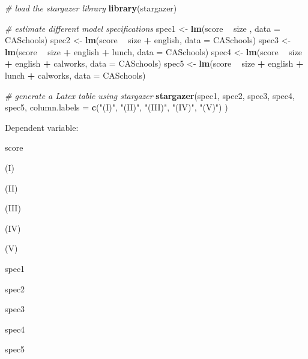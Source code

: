 \documentclass[]{book}
\newenvironment{Shaded}{\begin{snugshade}}{\end{snugshade}}
\newcommand{\KeywordTok}[1]{\textcolor[rgb]{0.13,0.29,0.53}{\textbf{#1}}}
\newcommand{\DataTypeTok}[1]{\textcolor[rgb]{0.13,0.29,0.53}{#1}}
\newcommand{\StringTok}[1]{\textcolor[rgb]{0.31,0.60,0.02}{#1}}
\newcommand{\CommentTok}[1]{\textcolor[rgb]{0.56,0.35,0.01}{\textit{#1}}}
\newcommand{\OperatorTok}[1]{\textcolor[rgb]{0.81,0.36,0.00}{\textbf{#1}}}
\newcommand{\NormalTok}[1]{#1}
\theoremstyle{definition}
\theoremstyle{definition}
\theoremstyle{definition}
\theoremstyle{remark}
\begin{document}
\begin{Shaded}
\begin{Highlighting}[]
\CommentTok{# load the stargazer library}
\KeywordTok{library}\NormalTok{(stargazer)}

\CommentTok{# estimate different model specifications}
\NormalTok{spec1 <-}\StringTok{ }\KeywordTok{lm}\NormalTok{(score }\OperatorTok{~}\StringTok{ }\NormalTok{size , }\DataTypeTok{data =}\NormalTok{ CASchools)}
\NormalTok{spec2 <-}\StringTok{ }\KeywordTok{lm}\NormalTok{(score }\OperatorTok{~}\StringTok{ }\NormalTok{size }\OperatorTok{+}\StringTok{ }\NormalTok{english, }\DataTypeTok{data =}\NormalTok{ CASchools)}
\NormalTok{spec3 <-}\StringTok{ }\KeywordTok{lm}\NormalTok{(score }\OperatorTok{~}\StringTok{ }\NormalTok{size }\OperatorTok{+}\StringTok{ }\NormalTok{english }\OperatorTok{+}\StringTok{ }\NormalTok{lunch, }\DataTypeTok{data =}\NormalTok{ CASchools)}
\NormalTok{spec4 <-}\StringTok{ }\KeywordTok{lm}\NormalTok{(score }\OperatorTok{~}\StringTok{ }\NormalTok{size }\OperatorTok{+}\StringTok{ }\NormalTok{english }\OperatorTok{+}\StringTok{ }\NormalTok{calworks, }\DataTypeTok{data =}\NormalTok{ CASchools)}
\NormalTok{spec5 <-}\StringTok{ }\KeywordTok{lm}\NormalTok{(score }\OperatorTok{~}\StringTok{ }\NormalTok{size }\OperatorTok{+}\StringTok{ }\NormalTok{english }\OperatorTok{+}\StringTok{ }\NormalTok{lunch }\OperatorTok{+}\StringTok{ }\NormalTok{calworks, }\DataTypeTok{data =}\NormalTok{ CASchools)}

\CommentTok{# generate a Latex table using stargazer}
\KeywordTok{stargazer}\NormalTok{(spec1, spec2, spec3, spec4, spec5, }
          \DataTypeTok{column.labels =} \KeywordTok{c}\NormalTok{(}\StringTok{"(I)"}\NormalTok{, }\StringTok{"(II)"}\NormalTok{, }\StringTok{"(III)"}\NormalTok{, }\StringTok{"(IV)"}\NormalTok{, }\StringTok{"(V)"}\NormalTok{)}
\NormalTok{          )}
\end{Highlighting}
\end{Shaded}

Dependent variable:

score

(I)

(II)

(III)

(IV)

(V)

spec1

spec2

spec3

spec4

spec5
\end{document}
